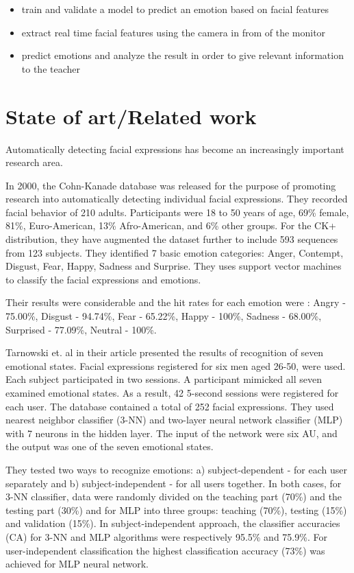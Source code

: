 \documentclass[runningheads,a4paper,11pt]{report}
\begin{document}
\begin{itemize}
    \item train and validate a model to predict an emotion based on facial features
    \item extract real time facial features using the camera in from of the monitor
    \item predict emotions and analyze the result in order to give relevant information to the teacher
\end{itemize}


\chapter{State of art/Related work}
\label{chapter:stateOfArt}

Automatically detecting facial expressions has become an increasingly important research area.

In 2000, the Cohn-Kanade database was released for the purpose of promoting research into automatically detecting individual facial expressions. \cite{Lucey10}
They recorded facial behavior of 210 adults. Participants were 18 to 50 years of age, 69\% female, 81\%, Euro-American, 13\% Afro-American, and 6\% other groups. For the CK+ distribution, they have augmented the dataset further to include 593 sequences from 123 subjects.
They identified 7 basic emotion categories: Anger, Contempt, Disgust, Fear, Happy, Sadness and Surprise.
They uses support vector machines to classify the facial expressions and emotions.

Their results were considerable and the hit rates for each emotion were : Angry - 75.00\%, Disgust - 94.74\%, Fear - 65.22\%, Happy - 100\%, Sadness - 68.00\%, Surprised - 77.09\%, Neutral - 100\%. \cite{Lucey10}


Tarnowski et. al in their article presented the results of recognition of seven emotional states. Facial expressions registered for six men aged 26-50, were used.
Each subject participated in two sessions. A participant mimicked all seven examined emotional states. As a result, 42 5-second sessions were registered for each user. The database contained a total of 252 facial expressions. \cite{Tarnowski17}
They used nearest neighbor classifier (3-NN) and two-layer neural network classifier (MLP) with 7 neurons in the hidden layer.
The input of the network were six AU, and the output was one of the seven emotional states.

They tested two ways to recognize emotions: a) subject-dependent - for each user separately and b) subject-independent - for all users together. In both cases, for 3-NN classifier, data were randomly divided on the teaching part (70\%) and the testing part (30\%) and for MLP into three groups: teaching (70\%), testing (15\%) and validation (15\%).
In subject-independent approach, the classifier accuracies (CA) for 3-NN and MLP algorithms were respectively 95.5\% and 75.9\%.
For user-independent classification the highest classification accuracy (73\%) was achieved for MLP neural network. \cite{Tarnowski17}
\end{document}
